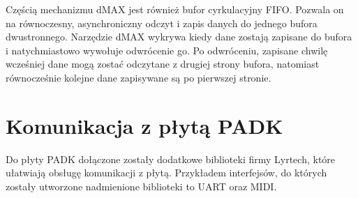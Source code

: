 Częścią mechanizmu dMAX jest również bufor cyrkulacyjny FIFO. Pozwala on na równoczesny, asynchroniczny odczyt i zapis danych do jednego bufora dwustronnego. Narzędzie dMAX wykrywa kiedy dane zostają zapisane do bufora i natychmiastowo wywołuje odwrócenie go. Po odwróceniu, zapisane chwilę wcześniej dane mogą zostać odczytane z drugiej strony bufora, natomiast równocześnie kolejne dane zapisywane są po pierwszej stronie.


\section{Komunikacja z płytą PADK}
Do płyty PADK dołączone zostały dodatkowe biblioteki firmy Lyrtech, które ułatwiają obsługę komunikacji z płytą. Przykładem interfejsów, do których zostały utworzone nadmienione biblioteki to UART oraz MIDI.

